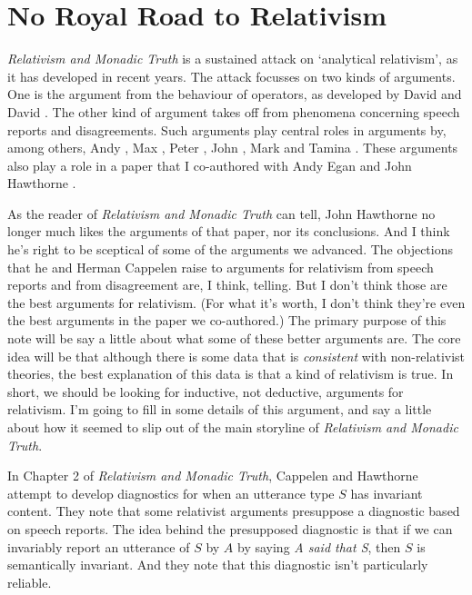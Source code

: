 \chapter{No Royal Road to Relativism}


\noindent \textit{Relativism and Monadic Truth} \nocite{CappelenHawthorne2009} is a sustained attack on `analytical relativism', as it has developed in recent years. The attack focusses on two kinds of arguments. One is the argument from the behaviour of operators, as developed by David \citet{Lewis1980b} and David \citet{Kaplan1977-KAPD}. The other kind of argument takes off from phenomena concerning speech reports and disagreements. Such arguments play central roles in arguments by, among others, Andy \citet{Egan2007-EGAEMR}, Max  \citet{Kolbel2009-KLBTEF}, Peter \citet{Lasersohn2005}, John \citet{MacFarlane2003-MACFCA, MacFarlane2007-MACRAD}, Mark \citet{Richard2004-RICCAR} and Tamina \citet{Stephenson2007-STEJDE}. These arguments also play a role in a paper that I co-authored with Andy Egan and John Hawthorne \citep{Egan2005-EGAEMI}.

As the reader of \textit{Relativism and Monadic Truth} can tell, John Hawthorne no longer much likes the arguments of that paper, nor its conclusions. And I think he's right to be sceptical of some of the arguments we advanced. The objections that he and Herman Cappelen raise to arguments for relativism from speech reports and from disagreement are, I think, telling. But I don't think those are the best arguments for relativism. (For what it's worth, I don't think they're even the best arguments in the paper we co-authored.) The primary purpose of this note will be say a little about what some of these better arguments are. The core idea will be that although there is some data that is \textit{consistent} with non-relativist theories, the best explanation of this data is that a kind of relativism is true. In short, we should be looking for inductive, not deductive, arguments for relativism. I'm going to fill in some details of this argument, and say a little about how it seemed to slip out of the main storyline of \textit{Relativism and Monadic Truth}.

In Chapter 2 of \textit{Relativism and Monadic Truth}, Cappelen and Hawthorne attempt to develop diagnostics for when an utterance type $S$ has invariant content. They note that some relativist arguments presuppose a diagnostic based on speech reports. The idea behind the presupposed diagnostic is that if we can invariably report an utterance of $S$ by $A$ by saying \textit{A said that S}, then $S$ is semantically invariant. And they note that this diagnostic isn't particularly reliable.

